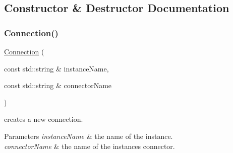 \subsection{Constructor \& Destructor Documentation}
\mbox{\label{class_open_chams_1_1_net_1_1_connection_a3e223d6a7eec0634d6b5cc90692b9cff}} 
\subsubsection{\texorpdfstring{Connection()}{Connection()}}
{\footnotesize\ttfamily \hyperlink{class_open_chams_1_1_net_1_1_connection}{Connection} (\begin{DoxyParamCaption}\item[{const std\+::string \&}]{instance\+Name,  }\item[{const std\+::string \&}]{connector\+Name }\end{DoxyParamCaption})}



creates a new connection. 


\begin{DoxyParams}{Parameters}
{\em instance\+Name} & the name of the instance. \\
\hline
{\em connector\+Name} & the name of the instance\textquotesingle{}s connector. \\
\hline
\end{DoxyParams}
